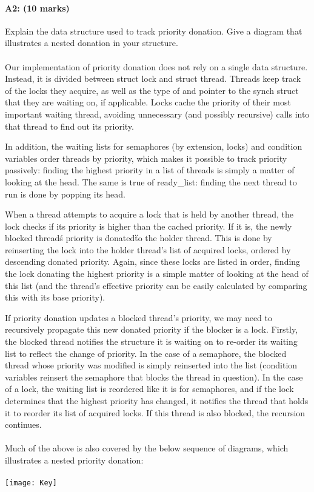 \paragraph{A2: (10 marks)}
Explain the data structure used to track priority donation. Give a diagram that illustrates a nested donation in your structure.
\\
\\
Our implementation of priority donation does not rely on a single data structure. Instead, it is divided between struct lock and struct thread. Threads keep track of the locks they acquire, as well as the type of and pointer to the synch struct that they are waiting on, if applicable. Locks cache the priority of their most important waiting thread, avoiding unnecessary (and possibly recursive) calls into that thread to find out its priority.

In addition, the waiting lists for semaphores (by extension, locks) and condition variables order threads by priority, which makes it possible to track priority passively: finding the highest priority in a list of threads is simply a matter of looking at the head. The same is true of ready\_list: finding the next thread to run is done by popping its head.

When a thread attempts to acquire a lock that is held by another thread, the lock checks if its priority is higher than the cached priority. If it is, the newly blocked thread\'s priority is \"donated\" to the holder thread. This is done by reinserting the lock into the holder thread's list of acquired locks, ordered by descending donated priority. Again, since these locks are listed in order, finding the lock donating the highest priority is a simple matter of looking at the head of this list (and the thread's effective priority can be easily calculated by comparing this with its base priority).

If priority donation updates a blocked thread's priority, we may need to recursively propagate this new donated priority if the blocker is a lock. Firstly, the blocked thread notifies the structure it is waiting on to re-order its waiting list to reflect the change of priority.
In the case of a semaphore, the blocked thread whose priority was modified is simply reinserted into the list (condition variables reinsert the semaphore that blocks the thread in question).
In the case of a lock, the waiting list is reordered like it is for semaphores, and if the lock determines that the highest priority has changed, it notifies the thread that holds it to reorder its list of acquired locks. If this thread is also blocked, the recursion continues.
\\
\\
Much of the above is also covered by the below sequence of diagrams, which illustrates a nested priority donation:
\\
\\
\texttt{[image: Key]}

